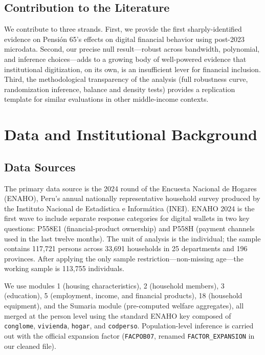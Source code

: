 \documentclass[12pt]{article}
\begin{document}
\subsection{Contribution to the Literature}

We contribute to three strands. First, we provide the first sharply-identified evidence on Pensi\'on 65's effects on digital financial behavior using post-2023 microdata. Second, our precise null result---robust across bandwidth, polynomial, and inference choices---adds to a growing body of well-powered evidence that institutional digitization, on its own, is an insufficient lever for financial inclusion. Third, the methodological transparency of the analysis (full robustness curve, randomization inference, balance and density tests) provides a replication template for similar evaluations in other middle-income contexts.


\section{Data and Institutional Background}
\label{sec:data}

\subsection{Data Sources}

The primary data source is the 2024 round of the Encuesta Nacional de Hogares (ENAHO), Peru's annual nationally representative household survey produced by the Instituto Nacional de Estad\'istica e Inform\'atica (INEI). ENAHO 2024 is the first wave to include separate response categories for digital wallets in two key questions: P558E1 (financial-product ownership) and P558H (payment channels used in the last twelve months). The unit of analysis is the individual; the sample contains 117,721 persons across 33,691 households in 25 departments and 196 provinces. After applying the only sample restriction---non-missing age---the working sample is 113,755 individuals.

We use modules 1 (housing characteristics), 2 (household members), 3 (education), 5 (employment, income, and financial products), 18 (household equipment), and the Sumaria module (pre-computed welfare aggregates), all merged at the person level using the standard ENAHO key composed of \texttt{conglome}, \texttt{vivienda}, \texttt{hogar}, and \texttt{codperso}. Population-level inference is carried out with the official expansion factor (\texttt{FACPOB07}, renamed \texttt{FACTOR\_EXPANSION} in our cleaned file).
\end{document}
